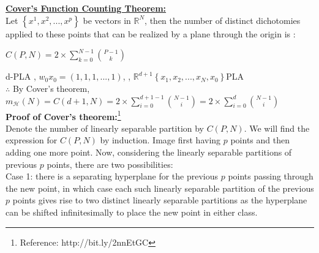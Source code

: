 \documentclass[a4paper,12pt]{article}
\begin{document}
\section{}
\underline{\textbf{Cover's Function Counting Theorem:}}\\
Let $\left \{ x^{1}, x^{2},...,x^{p} \right \}$ be vectors in $\mathbb{R}^{N}$, then the number of distinct dichotomies applied to these points that can be realized by a plane through the origin is :\\ 
\begin{center}
$C(P,N)=2\times \displaystyle \sum_{k=0}^{N-1} {{P-1}\choose{k}}$
\end{center}
{\MaQ{}}d-{\McQ{}}PLA {\MaQ{}}, {\MbQ{}}$w_{0}${\MaQ{}}$x_{0}=(1,1,1,...,1)$, {\MbQ{}}, {\McQ{}}$\mathbb{R}^{d+1}${\MaQ{}}$\left \{ x_{1}, x_{2},...,x_{N}, x_{0} \right \}${\MaQ{}}PLA{\MaQ{}}\\
$\therefore$ By Cover's theorem, $m_{\mathcal{H}}(N)=C(d+1,N)=2\times \displaystyle \sum_{i=0}^{d+1-1} {{N-1}\choose{i}}=2\times \displaystyle \sum_{i=0}^{d} {{N-1}\choose{i}}$ \\
\newline
\textbf{Proof of Cover's theorem:}\footnote{Reference: http://bit.ly/2nnEtGC}\\
Denote the number of linearly separable partition by $C(P,N)$. We will find the expression for $C(P,N)$ by induction. Image first having $p$ points and then adding one more point. Now, considering the linearly separable partitions of previous $p$ points, there are two possibilities:\\
Case 1: there is a separating hyperplane for the previous $p$ points passing through the new point, in which case each such linearly separable partition of the previous $p$ points gives rise to two distinct linearly separable partitions as the hyperplane can be shifted infinitesimally to place the new point in either class. \\
\end{document}
